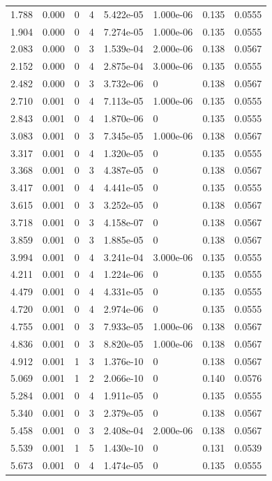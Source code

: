 \documentclass[preview]{standalone}
\begin{document}
{{\begin{tabular}{L{1.2cm}C{1.2cm} C{0.3cm}C{0.5cm} C{1.4cm}C{1.4cm} C{1.4cm}C{1.4cm}}
  1.788  &  0.000  & 0     &  4 &  5.422e-05  & 1.000e-06  & 0.135 &  0.0555   \\ 
  1.904  &  0.000  & 0     &  4 &  7.274e-05  & 1.000e-06  & 0.135 &  0.0555   \\ 
  2.083  &  0.000  & 0     &  3 &  1.539e-04  & 2.000e-06  & 0.138 &  0.0567   \\ 
  2.152  &  0.000  & 0     &  4 &  2.875e-04  & 3.000e-06  & 0.135 &  0.0555   \\ 
  2.482  &  0.000  & 0     &  3 &  3.732e-06  & 0  & 0.138 &  0.0567   \\ 
  2.710  &  0.001  & 0     &  4 &  7.113e-05  & 1.000e-06  & 0.135 &  0.0555   \\ 
  2.843  &  0.001  & 0     &  4 &  1.870e-06  & 0  & 0.135 &  0.0555   \\ 
  3.083  &  0.001  & 0     &  3 &  7.345e-05  & 1.000e-06  & 0.138 &  0.0567   \\ 
  3.317  &  0.001  & 0     &  4 &  1.320e-05  & 0  & 0.135 &  0.0555   \\ 
  3.368  &  0.001  & 0     &  3 &  4.387e-05  & 0  & 0.138 &  0.0567   \\ 
  3.417  &  0.001  & 0     &  4 &  4.441e-05  & 0  & 0.135 &  0.0555   \\ 
  3.615  &  0.001  & 0     &  3 &  3.252e-05  & 0  & 0.138 &  0.0567   \\ 
  3.718  &  0.001  & 0     &  3 &  4.158e-07  & 0  & 0.138 &  0.0567   \\ 
  3.859  &  0.001  & 0     &  3 &  1.885e-05  & 0  & 0.138 &  0.0567   \\ 
  3.994  &  0.001  & 0     &  4 &  3.241e-04  & 3.000e-06  & 0.135 &  0.0555   \\ 
  4.211  &  0.001  & 0     &  4 &  1.224e-06  & 0  & 0.135 &  0.0555   \\ 
  4.479  &  0.001  & 0     &  4 &  4.331e-05  & 0  & 0.135 &  0.0555   \\ 
  4.720  &  0.001  & 0     &  4 &  2.974e-06  & 0  & 0.135 &  0.0555   \\ 
  4.755  &  0.001  & 0     &  3 &  7.933e-05  & 1.000e-06  & 0.138 &  0.0567   \\ 
  4.836  &  0.001  & 0     &  3 &  8.820e-05  & 1.000e-06  & 0.138 &  0.0567   \\ 
  4.912  &  0.001  & 1     &  3 &  1.376e-10  & 0  & 0.138 &  0.0567   \\ 
  5.069  &  0.001  & 1     &  2 &  2.066e-10  & 0  & 0.140 &  0.0576   \\ 
  5.284  &  0.001  & 0     &  4 &  1.911e-05  & 0  & 0.135 &  0.0555   \\ 
  5.340  &  0.001  & 0     &  3 &  2.379e-05  & 0  & 0.138 &  0.0567   \\ 
  5.458  &  0.001  & 0     &  3 &  2.408e-04  & 2.000e-06  & 0.138 &  0.0567   \\ 
  5.539  &  0.001  & 1     &  5 &  1.430e-10  & 0  & 0.131 &  0.0539   \\ 
  5.673  &  0.001  & 0     &  4 &  1.474e-05  & 0  & 0.135 &  0.0555   \\ 
\hline 
\end{tabular} 

}}
\end{document}
